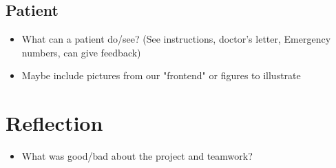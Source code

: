 \documentclass[]{report}
\begin{document}
\subsection{Patient}
\begin{itemize}
    \item What can a patient do/see? (See instructions, doctor's letter, Emergency numbers, can give feedback)
    \item Maybe include pictures from our "frontend" or figures to illustrate
\end{itemize}

\section{Reflection}
\begin{itemize}
    \item What was good/bad about the project and teamwork?
\end{itemize}

% 
\end{document}
